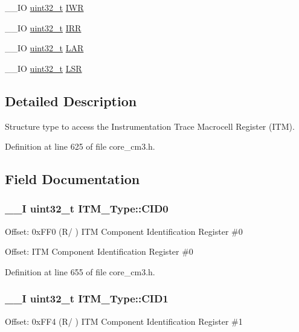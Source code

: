 \begin{DoxyCompactItemize}
\begin{tabbing}
\end{tabbing}\item 
\-\_\-\-\_\-\-I\-O \hyperlink{stdint_8h_a435d1572bf3f880d55459d9805097f62}{uint32\-\_\-t} \hyperlink{struct_i_t_m___type_af53499fc94cda629afb2fec858d2ad1c}{I\-W\-R}
\item 
\-\_\-\-\_\-\-I\-O \hyperlink{stdint_8h_a435d1572bf3f880d55459d9805097f62}{uint32\-\_\-t} \hyperlink{struct_i_t_m___type_ae43a66174b8ab182ff595e5f5da9f235}{I\-R\-R}
\item 
\-\_\-\-\_\-\-I\-O \hyperlink{stdint_8h_a435d1572bf3f880d55459d9805097f62}{uint32\-\_\-t} \hyperlink{struct_i_t_m___type_a33025af19748bd3ca5cf9d6b14150001}{L\-A\-R}
\item 
\-\_\-\-\_\-\-I\-O \hyperlink{stdint_8h_a435d1572bf3f880d55459d9805097f62}{uint32\-\_\-t} \hyperlink{struct_i_t_m___type_a56f607260c4175c5f37a28e47ab3d1e5}{L\-S\-R}
\end{DoxyCompactItemize}


\subsection{Detailed Description}
Structure type to access the Instrumentation Trace Macrocell Register (I\-T\-M). 

Definition at line 625 of file core\-\_\-cm3.\-h.



\subsection{Field Documentation}
\hypertarget{struct_i_t_m___type_a413f3bb0a15222e5f38fca4baeef14f6}{
\subsubsection[{C\-I\-D0}]{\setlength{\rightskip}{0pt plus 5cm}\-\_\-\-\_\-\-I {\bf uint32\-\_\-t} I\-T\-M\-\_\-\-Type\-::\-C\-I\-D0}}\label{struct_i_t_m___type_a413f3bb0a15222e5f38fca4baeef14f6}
Offset\-: 0x\-F\-F0 (R/ ) I\-T\-M Component Identification Register \#0

Offset\-: I\-T\-M Component Identification Register \#0 

Definition at line 655 of file core\-\_\-cm3.\-h.

\hypertarget{struct_i_t_m___type_a5f7d524b71f49e444ff0d1d52b3c3565}{
\subsubsection[{C\-I\-D1}]{\setlength{\rightskip}{0pt plus 5cm}\-\_\-\-\_\-\-I {\bf uint32\-\_\-t} I\-T\-M\-\_\-\-Type\-::\-C\-I\-D1}}\label{struct_i_t_m___type_a5f7d524b71f49e444ff0d1d52b3c3565}
Offset\-: 0x\-F\-F4 (R/ ) I\-T\-M Component Identification Register \#1

